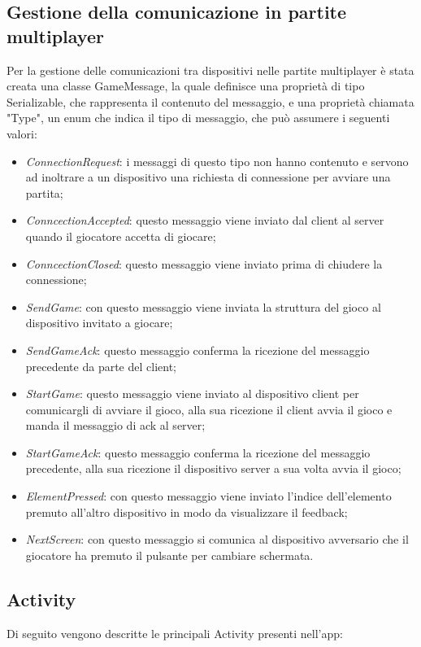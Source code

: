 \subsection{Gestione della comunicazione in partite multiplayer}
\noindent Per la gestione delle comunicazioni tra dispositivi nelle partite multiplayer \`{e} stata creata una classe GameMessage, la quale definisce una propriet\`{a} di tipo Serializable, che rappresenta il contenuto del messaggio, e una propriet\`{a} chiamata "Type", un enum che indica il tipo di messaggio, che pu\`{o} assumere i seguenti valori:
\begin{itemize}
\item \emph{ConnectionRequest}: i messaggi di questo tipo non hanno contenuto e servono ad inoltrare a un dispositivo una richiesta di connessione per avviare una partita;
\item \emph{ConncectionAccepted}: questo messaggio viene inviato dal client al server quando il giocatore accetta di giocare;
\item \emph{ConncectionClosed}: questo messaggio viene inviato prima di chiudere la connessione;
\item \emph{SendGame}: con questo messaggio viene inviata la struttura del gioco al dispositivo invitato a giocare;
\item \emph{SendGameAck}: questo messaggio conferma la ricezione del messaggio precedente da parte del client;
\item \emph{StartGame}: questo messaggio viene inviato al dispositivo client per comunicargli di avviare il gioco, alla sua ricezione il client avvia il gioco e manda il messaggio di ack al server;
\item \emph{StartGameAck}: questo messaggio conferma la ricezione del messaggio precedente, alla sua ricezione il dispositivo server a sua volta avvia il gioco;
\item \emph{ElementPressed}: con questo messaggio viene inviato l'indice dell'elemento premuto all'altro dispositivo in modo da visualizzare il feedback;
\item \emph{NextScreen}: con questo messaggio si comunica al dispositivo avversario che il giocatore ha premuto il pulsante per cambiare schermata.
\end{itemize}

\subsection{Activity}

\noindent Di seguito vengono descritte le principali Activity presenti nell'app:

